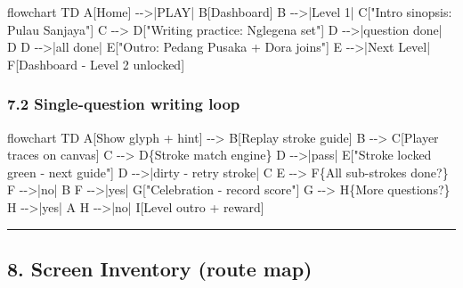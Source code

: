 \documentclass[
  11pt,
]{article}
\newenvironment{Shaded}{}{}
\newcommand{\NormalTok}[1]{#1}
\begin{document}
\begin{Shaded}
\begin{Highlighting}[]
\NormalTok{flowchart TD}
\NormalTok{  A[Home] {-}{-}\textgreater{}|PLAY| B[Dashboard]}
\NormalTok{  B {-}{-}\textgreater{}|Level 1| C["Intro sinopsis: Pulau Sanjaya"]}
\NormalTok{  C {-}{-}\textgreater{} D["Writing practice: Nglegena set"]}
\NormalTok{  D {-}{-}\textgreater{}|question done| D}
\NormalTok{  D {-}{-}\textgreater{}|all done| E["Outro: Pedang Pusaka + Dora joins"]}
\NormalTok{  E {-}{-}\textgreater{}|Next Level| F[Dashboard {-} Level 2 unlocked]}
\end{Highlighting}
\end{Shaded}

\subsubsection{7.2 Single-question writing
loop}\label{single-question-writing-loop}

\begin{Shaded}
\begin{Highlighting}[]
\NormalTok{flowchart TD}
\NormalTok{  A[Show glyph + hint] {-}{-}\textgreater{} B[Replay stroke guide]}
\NormalTok{  B {-}{-}\textgreater{} C[Player traces on canvas]}
\NormalTok{  C {-}{-}\textgreater{} D\{Stroke match engine\}}
\NormalTok{  D {-}{-}\textgreater{}|pass| E["Stroke locked green {-} next guide"]}
\NormalTok{  D {-}{-}\textgreater{}|dirty {-} retry stroke| C}
\NormalTok{  E {-}{-}\textgreater{} F\{All sub{-}strokes done?\}}
\NormalTok{  F {-}{-}\textgreater{}|no| B}
\NormalTok{  F {-}{-}\textgreater{}|yes| G["Celebration {-} record score"]}
\NormalTok{  G {-}{-}\textgreater{} H\{More questions?\}}
\NormalTok{  H {-}{-}\textgreater{}|yes| A}
\NormalTok{  H {-}{-}\textgreater{}|no| I[Level outro + reward]}
\end{Highlighting}
\end{Shaded}

\begin{center}\rule{0.5\linewidth}{0.5pt}\end{center}

\subsection{8. Screen Inventory (route
map)}\label{screen-inventory-route-map}
\end{document}
